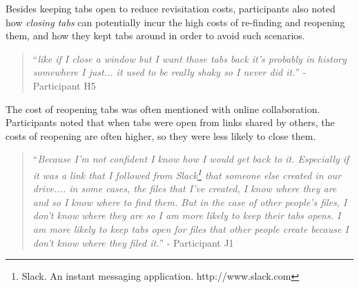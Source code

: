 Besides keeping tabs open to reduce revisitation costs, participants also noted how \emph{closing tabs} can potentially incur the high costs of re-finding and reopening them, and how they kept tabs around in order to avoid such scenarios.


\begin{quote}
``\emph{like if I close a window but I want those tabs back it's probably in history somewhere I just... it used to be really shaky so I never did it.}'' - Participant H5
\end{quote}



	


The cost of reopening tabs was often mentioned with online collaboration. Participants noted that when tabs were open from links shared by others, the costs of reopening are often higher, so they were less likely to close them.

\begin{quote}
``\emph{Because I'm not confident I know how I would get back to it. Especially if it was a link that I followed from Slack\footnote{Slack. An instant messaging application. http://www.slack.com} that someone else created in our drive.... in some cases, the files that I've created, I know where they are and so I know where to find them. But in the case of other people's files, I don't know where they are so I am more likely to keep their tabs opens. I am more likely to keep tabs open for files that other people create because I don't know where they filed it.}'' - Participant J1
\end{quote}




